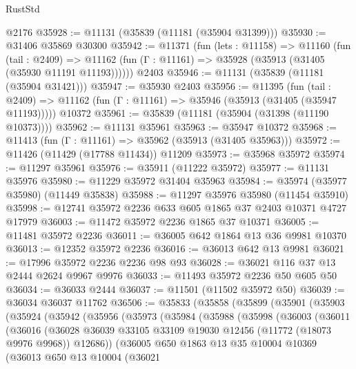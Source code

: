 \begin{lexlean}{RustStd}
\begin{coremodule}
    @2176
@35928 := @11131 (@35839 (@11181 (@35904 @31399)))
@35930 := @31406 @35869 @30300
@35942 := @11371
    (fun (lets : @11158) =>
    @11160
      (fun (tail : @2409) =>
      @11162 (fun (Γ : @11161) => @35928 (@35913 (@31405 (@35930 @11191 @11193))))))
    @2403
@35946 := @11131 (@35839 (@11181 (@35904 @31421)))
@35947 := @35930 @2403
@35956 := @11395
    (fun (tail : @2409) => @11162 (fun (Γ : @11161) => @35946 (@35913 (@31405 (@35947 @11193)))))
    @10372
@35961 := @35839 (@11181 (@35904 (@31398 (@11190 @10373))))
@35962 := @11131 @35961
@35963 := @35947 @10372
@35968 := @11413 (fun (Γ : @11161) => @35962 (@35913 (@31405 @35963)))
@35972 := @11426 (@11429 (@17788 @11434)) @11209
@35973 := @35968 @35972
@35974 := @11297 @35961
@35976 := @35911 (@11222 @35972)
@35977 := @11131 @35976
@35980 := @11229 @35972 @31404 @35963
@35984 := @35974 (@35977 @35980) (@11449 @35838)
@35988 := @11297 @35976 @35980 (@11454 @35910)
@35998 := @12741 @35972 @2236 @633 @605 @1865 @37 @2403 @10371 @4727 @17979
@36003 := @11472 @35972 @2236 @1865 @37 @10371
@36005 := @11481 @35972 @2236
@36011 := @36005 @642 @1864 @13 @36 @9981 @10370
@36013 := @12352 @35972 @2236
@36016 := @36013 @642 @13 @9981
@36021 := @17996 @35972 @2236 @2236 @98 @93
@36028 := @36021 @116 @37 @13 @2444 @2624 @9967 @9976
@36033 := @11493 @35972 @2236 @50 @605 @50
@36034 := @36033 @2444
@36037 := @11501 (@11502 @35972 @50)
@36039 := @36034 @36037 @11762
@36506 := @35833
    (@35858
      (@35899
        (@35901
          (@35903
            (@35924
              (@35942
                (@35956
                  (@35973
                    (@35984
                      (@35988
                        (@35998
                          (@36003
                            (@36011
                              (@36016
                                (@36028
                                  @36039
                                  @33105
                                  @33109
                                  @19030
                                  @12456
                                  (@11772 (@18073 @9976 @9968))
                                  @12686))
                              (@36005
                                @650
                                @1863
                                @13
                                @35
                                @10004
                                @10369
                                (@36013
                                  @650
                                  @13
                                  @10004
                                  (@36021

\end{coremodule}
\end{lexlean}
